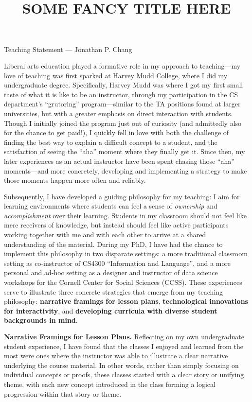 \documentclass[11pt,letterpaper]{article}
\title{SOME FANCY TITLE HERE}
\renewcommand{\section}[1]{\vspace{0.25\baselineskip}\noindent\textbf{#1.}}
\begin{document}
\maketitle

\begin{center}
Teaching Statement --- Jonathan P. Chang
\end{center}

Liberal arts education played a formative role in my approach to teaching---my love of teaching was first sparked at Harvey Mudd College, where I did my undergraduate degree.
Specifically, Harvey Mudd was where I got my first small taste of what it is like to be an instructor, through my participation in the CS department's ``grutoring'' program---similar to the TA positions found at larger universities, but with a greater emphasis on direct interaction with students.
Though I initially joined the program just out of curiosity (and admittedly also for the chance to get paid!), I quickly fell in love with both the challenge of finding the best way to explain a difficult concept to a student, and the satisfaction of seeing the ``aha'' moment where they finally get it.
Since then, my later experiences as an actual instructor have been spent chasing those ``aha'' moments---and more concretely, developing and implementing a strategy to make those moments happen more often and reliably.

Subsequently, I have developed a guiding philosophy for my teaching: I aim for learning environments where students can feel a sense of \emph{ownership} and \emph{accomplishment} over their learning.
Students in my classroom should not feel like mere receivers of knowledge, but instead should feel like active participants working together with me and with each other to arrive at a shared understanding of the material.
During my PhD, I have had the chance to implement this philosophy in two disparate settings: a more traditional classroom setting as co-instructor of CS4300 ``Information and Language'', and a more personal and ad-hoc setting as a designer and instructor of data science workshops for the Cornell Center for Social Sciences (CCSS).
These experiences serve to illustrate three concrete strategies that emerge from my teaching philosophy: \textbf{narrative framings for lesson plans}, \textbf{technological innovations for interactivity}, and \textbf{developing curricula with diverse student backgrounds in mind}.

\section{Narrative Framings for Lesson Plans}
Reflecting on my own undergraduate student experience, I have found that the classes I enjoyed and learned from the most were ones where the instructor was able to illustrate a clear narrative underlying the course material.
In other words, rather than simply focusing on individual concepts or proofs, these classes started with a clear story or unifying theme, with each new concept introduced in the class forming a logical progression within that story or theme.
\end{document}
